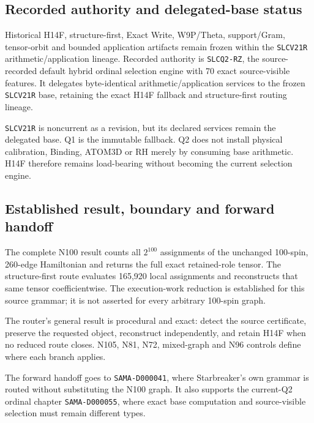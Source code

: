 \subsection{Recorded authority and delegated-base
status}\label{viii-ch01-recorded-authority-and-delegated-base-status}

Historical H14F, structure-first, Exact Write, W9P/Theta, support/Gram,
tensor-orbit and bounded application artifacts remain frozen within the
\texttt{SLCV21R} arithmetic/application lineage. Recorded authority is \texttt{SLCQ2-RZ}, the source-recorded default hybrid ordinal selection engine with 70 exact source-visible features. It delegates byte-identical arithmetic/application services to the frozen \texttt{SLCV21R} base, retaining the exact H14F fallback and structure-first routing lineage.


\texttt{SLCV21R} is noncurrent as a revision, but its declared services
remain the delegated base. Q1 is the immutable fallback. Q2 does not
install physical calibration, Binding, ATOM3D or RH merely by consuming
base arithmetic. H14F therefore remains load-bearing without becoming
the current selection engine.

\subsection{Established result, boundary and forward
handoff}\label{viii-ch01-established-result-boundary-and-forward-handoff}

The complete N100 result counts all \(2^{100}\) assignments of the
unchanged 100-spin, 260-edge Hamiltonian and returns the full exact
retained-role tensor. The structure-first route evaluates 165,920 local
assignments and reconstructs that same tensor coefficientwise. The
execution-work reduction is established for this source grammar; it is
not asserted for every arbitrary 100-spin graph.

The router's general result is procedural and exact: detect the source
certificate, preserve the requested object, reconstruct independently,
and retain H14F when no reduced route closes. N105, N81, N72,
mixed-graph and N96 controls define where each branch applies.

The forward handoff goes to \texttt{SAMA-D000041}, where Starbreaker's
own grammar is routed without substituting the N100 graph. It also
supports the current-Q2 ordinal chapter \texttt{SAMA-D000055}, where
exact base computation and source-visible selection must remain
different types.

